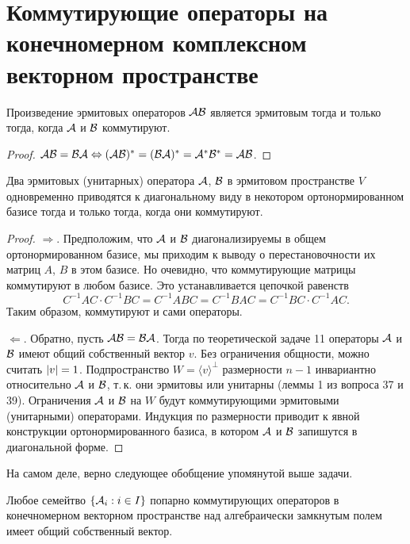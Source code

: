 \section{Коммутирующие операторы на конечномерном комплексном векторном пространстве}

\begin{theorem}
    Произведение эрмитовых операторов $\mathcal{A}\mathcal{B}$ является эрмитовым тогда и только тогда, когда $\mathcal{A}$ и $\mathcal{B}$ коммутируют.
\end{theorem}

\begin{proof}
    $\mathcal{A}\mathcal{B} = \mathcal{B}\mathcal{A} \Leftrightarrow (\mathcal{A}\mathcal{B})^\ast = (\mathcal{B}\mathcal{A})^\ast = \mathcal{A}^\ast\mathcal{B}^\ast = \mathcal{A}\mathcal{B}$.
\end{proof}

\begin{theorem}
    Два эрмитовых (унитарных) оператора $\mathcal{A}$, $\mathcal{B}$ в эрмитовом пространстве $V$ одновременно приводятся к диагональному виду в некотором ортонормированном базисе тогда и только тогда, когда они коммутируют.
\end{theorem}

\begin{proof}
    $\Rightarrow$. Предположим, что $\mathcal{A}$ и $\mathcal{B}$ диагонализируемы в общем ортонормированном базисе, мы приходим к выводу о перестановочности их матриц $A$, $B$ в этом базисе. Но очевидно, что коммутирующие матрицы коммутируют в любом базисе. Это устанавливается цепочкой равенств
    \[
        C^{-1}AC \cdot C^{-1}BC = C^{-1}ABC = C^{-1}BAC = C^{-1}BC \cdot C^{-1}AC.
    \]
    Таким образом, коммутируют и сами операторы.

    $\Leftarrow$. Обратно, пусть $\mathcal{A}\mathcal{B} = \mathcal{B}\mathcal{A}$. Тогда по теоретической задаче 11 операторы $\mathcal{A}$ и $\mathcal{B}$ имеют общий собственный вектор $v$. Без ограничения общности, можно считать $\left\lvert v\right\rvert = 1$. Подпространство $W = \langle v\rangle^\perp$ размерности $n - 1$ инвариантно относительно $\mathcal{A}$ и $\mathcal{B}$, т.\,к. они эрмитовы или унитарны (леммы 1 из вопроса 37 и 39). Ограничения $\mathcal{A}$ и $\mathcal{B}$ на $W$ будут коммутирующими эрмитовыми (унитарными) операторами. Индукция по размерности приводит к явной конструкции ортонормированного базиса, в котором $\mathcal{A}$ и $\mathcal{B}$ запишутся в диагональной форме.
\end{proof}

На самом деле, верно следующее обобщение упомянутой выше задачи.

\begin{theorem}
    Любое семейтво $\{\mathcal{A}_i : i \in I\}$ попарно коммутирующих операторов в конечномерном векторном пространстве над алгебраически замкнутым полем имеет общий собственный вектор.
\end{theorem}


